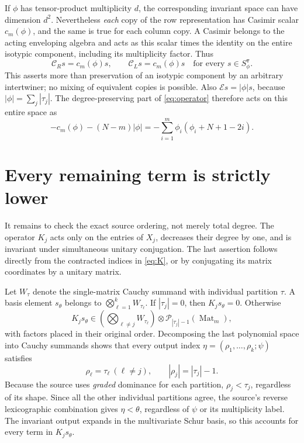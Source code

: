 \documentclass[11pt]{article}
\newcommand{\E}{\mathcal E}
\newcommand{\C}{\mathcal C}
\begin{document}
If $\phi$ has tensor-product multiplicity $d$, the corresponding invariant
space can have dimension $d^2$. Nevertheless \emph{each} copy of the
row representation has Casimir scalar $c_m(\phi)$, and the same is true
for each column copy. A Casimir belongs to the acting enveloping algebra
and acts as this scalar times the identity on the entire isotypic
component, including its multiplicity factor. Thus
\begin{equation}\label{eq:copies}
 \C_R s=c_m(\phi)s,\qquad
 \C_L s=c_m(\phi)s
 \quad\text{for every }s\in S^{\boldsymbol\tau}_\phi.
\end{equation}
This asserts more than preservation of an isotypic component by an
arbitrary intertwiner; no mixing of equivalent copies is possible.
Also $\E s=|\phi|s$, because
$|\phi|=\sum_j|\tau_j|$. The degree-preserving part of
\eqref{eq:operator} therefore acts on this entire space as
\[
 -c_m(\phi)-(N-m)|\phi|
 =-\sum_{i=1}^m\phi_i(\phi_i+N+1-2i).
\]

\section*{Every remaining term is strictly lower}
It remains to check the exact source ordering, not merely total degree.
The operator $K_j$ acts only on the entries of $X_j$, decreases their
degree by one, and is invariant under simultaneous unitary conjugation.
The last assertion follows directly from the contracted indices in
\eqref{eq:K}, or by conjugating its matrix coordinates by a unitary matrix.

Let $W_\tau$ denote the single-matrix Cauchy summand with individual
partition $\tau$. A basis element $s_\theta$ belongs to
$\bigotimes_{\ell=1}^kW_{\tau_\ell}$. If $|\tau_j|=0$, then
$K_js_\theta=0$. Otherwise
\[
 K_js_\theta\in
 \left(\bigotimes_{\ell\ne j}W_{\tau_\ell}\right)
 \otimes\mathcal P_{|\tau_j|-1}(\operatorname{Mat}_m),
\]
with factors placed in their original order. Decomposing the last
polynomial space into Cauchy summands shows that every output index
$\eta=(\rho_1,\ldots,\rho_k;\psi)$ satisfies
\[
 \rho_\ell=\tau_\ell\ (\ell\ne j),\qquad
 |\rho_j|=|\tau_j|-1.
\]
Because the source uses \emph{graded} dominance for each partition,
$\rho_j<\tau_j$, regardless of its shape. Since all the other individual
partitions agree, the source's reverse lexicographic combination gives
$\eta<\theta$, regardless of $\psi$ or its multiplicity label.
The invariant output expands in the multivariate Schur basis, so this
accounts for every term in $K_js_\theta$.
\end{document}
